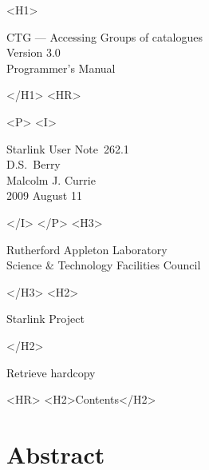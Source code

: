 \documentclass[twoside,11pt]{article}
\newcommand{\stardoccategory}  {Starlink User Note}
\newcommand{\stardocsource}    {sun\stardocnumber}
\newcommand{\stardocnumber}    {262.1}
\newcommand{\stardocauthors}   {D.S.\ Berry \\ Malcolm J. Currie}
\newcommand{\stardocdate}      {2009 August 11}
\newcommand{\stardoctitle}     {CTG --- Accessing Groups of catalogues}
\newcommand{\stardocversion}   {Version 3.0}
\newcommand{\stardocmanual}    {Programmer's Manual}
\newcommand{\htmladdnormallink}[2]{#1}
\newcommand{\htmladdimg}[1]{}
\newcommand{\htmlref}[2]{#1}
\newcommand{\htmladdtonavigation}[1]{}
\newcommand{\xlabel}[1]{}
\renewcommand{\_}{\texttt{\symbol{95}}}
\begin{document}
\begin{htmlonly}
   \xlabel{}
   \begin{rawhtml} <H1> \end{rawhtml}
      \stardoctitle\\
      \stardocversion\\
      \stardocmanual
   \begin{rawhtml} </H1> <HR> \end{rawhtml}


   \begin{rawhtml} <P> <I> \end{rawhtml}
   \stardoccategory\ \stardocnumber \\
   \stardocauthors \\
   \stardocdate
   \begin{rawhtml} </I> </P> <H3> \end{rawhtml}
      \htmladdnormallink{Rutherford Appleton Laboratory}
                        {http://www.scitech.ac.uk} \\
      \htmladdnormallink{Science \& Technology Facilities Council}
                        {http://www.scitech.ac.uk} \\
   \begin{rawhtml} </H3> <H2> \end{rawhtml}
      \htmladdnormallink{Starlink Project}{http://www.starlink.ac.uk/}
   \begin{rawhtml} </H2> \end{rawhtml}
   \htmladdnormallink{\htmladdimg{source.gif} Retrieve hardcopy}
      {http://www.starlink.ac.uk/cgi-bin/hcserver?\stardocsource}\\

  \label{stardoccontents}
  \begin{rawhtml} 
    <HR>
    <H2>Contents</H2>
  \end{rawhtml}
  \htmladdtonavigation{\htmlref{\htmladdimg{contents_motif.gif}}
        {stardoccontents}}

  \section{\xlabel{abstract}Abstract}
\end{htmlonly}
\end{document}
